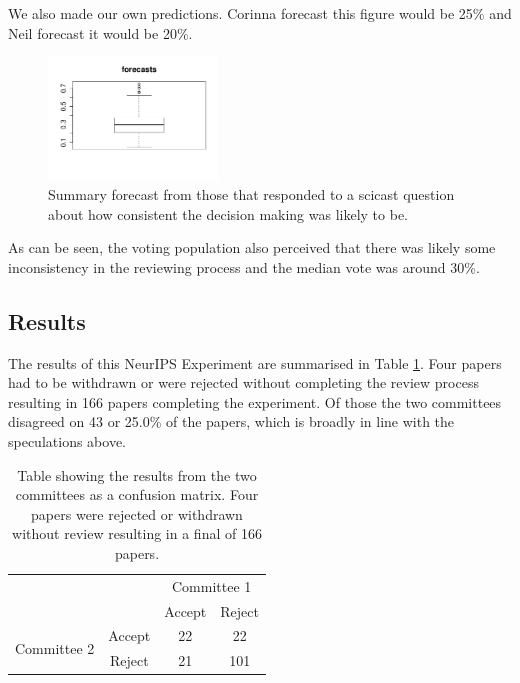 \documentclass[twoside]{article}
\begin{document}
We also made our own predictions.  Corinna forecast this figure would be
25\% and Neil forecast it would be 20\%. 

\begin{figure}[htb]
\begin{center}
\includegraphics[width=0.40\textwidth]{diagrams/neurips/scicast-forecast.png}
\end{center}
\caption{Summary forecast from those that responded to a scicast question about how consistent the decision making was likely to be.}
\label{scicast-forecast}
\end{figure}

As can be seen, the voting population also perceived that there was likely some inconsistency in the 
reviewing process and the median vote was around 30\%.

\subsection{Results}

The results of this NeurIPS Experiment are summarised in Table
\ref{table-neurips-experiment-results}. Four papers had to
be withdrawn or were rejected without completing the review process
resulting in 166 papers completing the experiment. Of those the two committees disagreed
on 43 or 25.0\% of the papers, which is broadly in line with the speculations above.

\begin{table}[htb]
\caption{Table showing the results from the two committees as a
  confusion matrix. Four papers were rejected or withdrawn without
  review resulting in a final of 166 papers.}
\label{table-neurips-experiment-results}
\centering
\begin{tabular}{lc|c|c|}
& & \multicolumn{2}{c}{Committee 1} \\
& & Accept & Reject \\ \hline
\multirow{2}{*}{Committee 2} & Accept & 22 & 22 \\
& Reject & 21 & 101 
\end{tabular}
\end{table}
\end{document}
